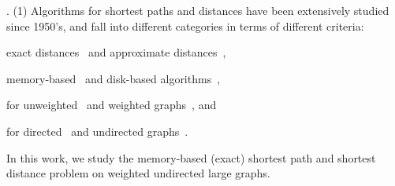 
.
(1) Algorithms for shortest  paths and distances have been extensively studied since 1950's, and fall into different categories
 in terms of different criteria:

 \bi
 \item exact distances~\cite{WuXDCZZ12,Dijkstra59,FredmanT84,LubyR89,GeisbergerSSD08,SankaranarayananSA09,SandersS05,GoldbergH05,MozesS12,ChengKCC12,MozesS12,ChanL07,SaundersT07,WagnerW07,bast2014route,delling2014robust,arz2013transit}
     and approximate distances~\cite{PotamiasBCG09,SarmaGNP10,ThorupZ05,SankaranarayananS10},


 \item memory-based~\cite{PotamiasBCG09,SarmaGNP10,WuXDCZZ12,Dijkstra59,FredmanT84,LubyR89,GeisbergerSSD08,Wei10,SankaranarayananSA09,SandersS05,
ThorupZ05,MozesS12,SaundersT07,WagnerW07,bast2014route,delling2014robust,arz2013transit,SankaranarayananS10} and disk-based algorithms~\cite{ChengKCC12,ChanL07},


 \item for unweighted~\cite{PotamiasBCG09,SarmaGNP10,Wei10,bast2014route,delling2014robust,arz2013transit} and weighted graphs~\cite{WuXDCZZ12,Dijkstra59,FredmanT84,LubyR89,GeisbergerSSD08,SankaranarayananSA09,GoldbergH05,MozesS12,SandersS05,ChengKCC12,ThorupZ05,MozesS12,ChanL07,SaundersT07,WagnerW07,bast2014route,delling2014robust,arz2013transit,SankaranarayananS10},
     and


 \item for directed~\cite{SaundersT07,GoldbergH05,MozesS12,bast2014route,delling2014robust,arz2013transit} and undirected graphs~\cite{PotamiasBCG09,SarmaGNP10,WuXDCZZ12,Dijkstra59,FredmanT84,LubyR89,GeisbergerSSD08,Wei10,SankaranarayananSA09,SandersS05,ChengKCC12,ThorupZ05,MozesS12,ChanL07,WagnerW07,bast2014route,delling2014robust,arz2013transit,SankaranarayananS10}.
 \ei


In this work, we study the memory-based (exact)  shortest path and shortest distance problem on weighted undirected large graphs.


